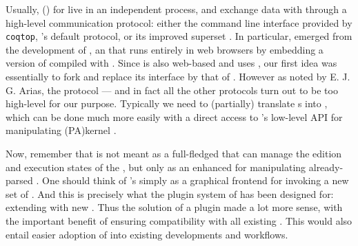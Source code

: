 \AP
Usually,  () for
 live in an independent process, and exchange data with  through
a high-level communication protocol: either the command line interface provided
by \texttt{coqtop}, 's default  protocol, or its improved
superset  . In particular,
 emerged from the development of 
, an  that runs entirely in web browsers by
embedding a version of  compiled with . Since
 is also web-based and uses , our first idea was
essentially to fork  and replace its interface by that of .
However as noted by E. J. G. Arias, the  protocol --- and in fact all
the other protocols turn out to be too high-level for our purpose. Typically we
need to (partially) translate  s into  ,
which can be done much more easily with a direct access to 's low-level
API for manipulating \kl(PA){kernel} .

Now, remember that  is not meant as a full-fledged  that can
manage the edition and execution states of the , but only as an
enhanced  for manipulating already-parsed . One should
think of 's  simply as a graphical frontend for invoking a new
set of . And this is precisely what the plugin system of 
has been designed for: extending  with new . Thus the
solution of a  plugin made a lot more sense, with the important benefit
of ensuring compatibility with all existing . This would also entail
easier adoption of  into existing  developments and
workflows.

